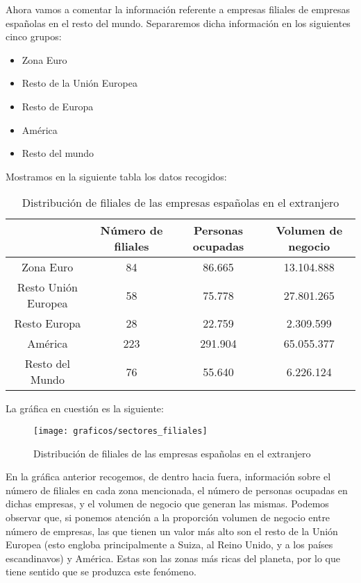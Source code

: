 \documentclass[11pt]{article}
\theoremstyle{plain}
\theoremstyle{definition}
\begin{document}
Ahora vamos a comentar la información referente a empresas filiales de
empresas españolas en el resto del mundo. Separaremos dicha
información en los siguientes cinco grupos:

\begin{itemize}
\item Zona Euro
\item Resto de la Unión Europea
\item Resto de Europa
\item América
\item Resto del mundo
\end{itemize}

Mostramos en la siguiente tabla los datos recogidos:

\begin{table}[H]
  \centering
  \begin{tabular}{|c|c|c|c|}
    \hline
    &  Número de filiales &  Personas  ocupadas & Volumen de negocio \\
    \hline
    Zona Euro & 84  & 86.665  & 13.104.888 \\
    Resto Unión Europea & 58  & 75.778  & 27.801.265 \\
    Resto Europa  & 28  & 22.759  & 2.309.599 \\
    América & 223 & 291.904 & 65.055.377 \\
    Resto del Mundo & 76  & 55.640  & 6.226.124 \\
    \hline
  \end{tabular}
  \caption{Distribución de filiales de las empresas españolas en el extranjero}
\end{table}

La gráfica en cuestión es la siguiente:

\begin{figure}[H]
  \centering
  \texttt{[image: graficos/sectores\_filiales]}
  \caption{Distribución de filiales de las empresas españolas en el
    extranjero}
\end{figure}

En la gráfica anterior recogemos, de dentro hacia fuera, información
sobre el número de filiales en cada zona mencionada, el número de
personas ocupadas en dichas empresas, y el volumen de negocio que
generan las mismas. Podemos observar que, si ponemos atención a la
proporción volumen de negocio entre número de empresas, las que tienen
un valor más alto son el resto de la Unión Europea (esto engloba
principalmente a Suiza, al Reino Unido, y a los países escandinavos) y
América. Estas son las zonas más ricas del planeta, por lo que tiene
sentido que se produzca este fenómeno.
\end{document}

